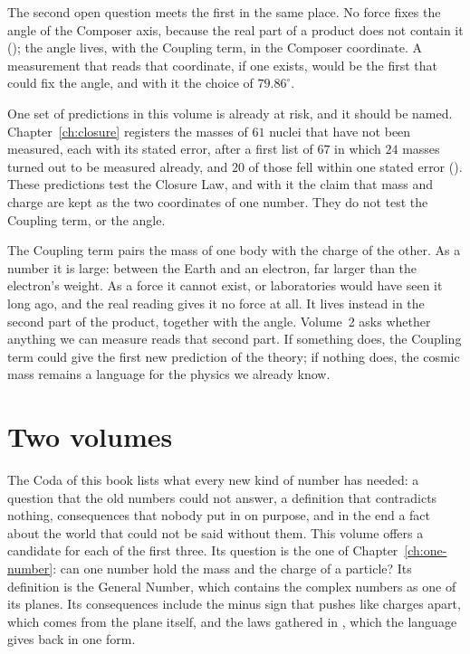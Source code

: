 The second open question meets the first in the same place. No force fixes the angle of the Composer axis, because the real part of a product does not contain it (); the angle lives, with the Coupling term, in the Composer coordinate. A measurement that reads that coordinate, if one exists, would be the first that could fix the angle, and with it the choice of $79.86^\circ$.

One set of predictions in this volume is already at risk, and it should be named. Chapter~\ref{ch:closure} registers the masses of $61$ nuclei that have not been measured, each with its stated error, after a first list of $67$ in which $24$ masses turned out to be measured already, and $20$ of those fell within one stated error (). These predictions test the Closure Law, and with it the claim that mass and charge are kept as the two coordinates of one number. They do not test the Coupling term, or the angle.

\begin{plainwords}
The Coupling term pairs the mass of one body with the charge of the other. As a number it is large: between the Earth and an electron, far larger than the electron's weight. As a force it cannot exist, or laboratories would have seen it long ago, and the real reading gives it no force at all. It lives instead in the second part of the product, together with the angle. Volume~2 asks whether anything we can measure reads that second part. If something does, the Coupling term could give the first new prediction of the theory; if nothing does, the cosmic mass remains a language for the physics we already know.
\end{plainwords}

\section*{Two volumes}\label{sec:al-close}

The Coda of this book lists what every new kind of number has needed: a question that the old numbers could not answer, a definition that contradicts nothing, consequences that nobody put in on purpose, and in the end a fact about the world that could not be said without them. This volume offers a candidate for each of the first three. Its question is the one of Chapter~\ref{ch:one-number}: can one number hold the mass and the charge of a particle? Its definition is the General Number, which contains the complex numbers as one of its planes. Its consequences include the minus sign that pushes like charges apart, which comes from the plane itself, and the laws gathered in , which the language gives back in one form.

